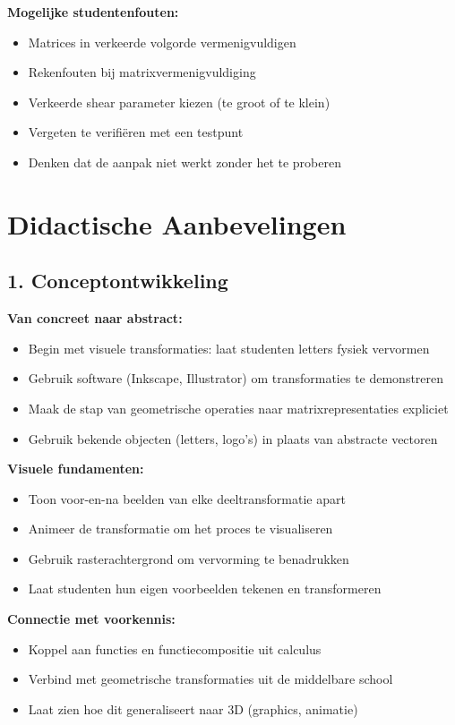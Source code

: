 \documentclass{ximera}
\begin{document}
\begin{freeResponse}
\textbf{Mogelijke studentenfouten:}
\begin{itemize}
\item Matrices in verkeerde volgorde vermenigvuldigen
\item Rekenfouten bij matrixvermenigvuldiging
\item Verkeerde shear parameter kiezen (te groot of te klein)
\item Vergeten te verifiëren met een testpunt
\item Denken dat de aanpak niet werkt zonder het te proberen
\end{itemize}
\end{freeResponse}

\section*{Didactische Aanbevelingen}

\subsection*{1. Conceptontwikkeling}

\textbf{Van concreet naar abstract:}
\begin{itemize}
\item Begin met visuele transformaties: laat studenten letters fysiek vervormen
\item Gebruik software (Inkscape, Illustrator) om transformaties te demonstreren
\item Maak de stap van geometrische operaties naar matrixrepresentaties expliciet
\item Gebruik bekende objecten (letters, logo's) in plaats van abstracte vectoren
\end{itemize}

\textbf{Visuele fundamenten:}
\begin{itemize}
\item Toon voor-en-na beelden van elke deeltransformatie apart
\item Animeer de transformatie om het proces te visualiseren
\item Gebruik rasterachtergrond om vervorming te benadrukken
\item Laat studenten hun eigen voorbeelden tekenen en transformeren
\end{itemize}

\textbf{Connectie met voorkennis:}
\begin{itemize}
\item Koppel aan functies en functiecompositie uit calculus
\item Verbind met geometrische transformaties uit de middelbare school
\item Laat zien hoe dit generaliseert naar 3D (graphics, animatie)
\end{itemize}
\end{document}
